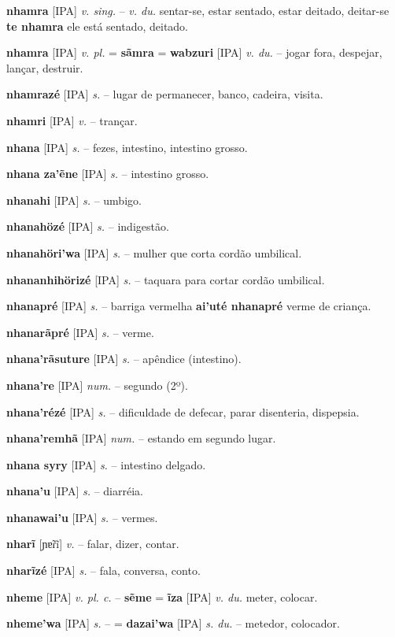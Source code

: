 \textbf{nhamra} [IPA] \textit{v. sing.} -- \textit{v. du.} sentar-se, estar sentado, estar deitado, deitar-se  \textbf{te nhamra} ele está sentado, deitado.

\textbf{nhamra} [IPA] \textit{v. pl.} = \textbf{sãmra} = \textbf{wabzuri} [IPA] \textit{v. du.} -- jogar fora, despejar, lançar, destruir.

\textbf{nhamrazé} [IPA] \textit{s.} -- lugar de permanecer, banco, cadeira, visita.

\textbf{nhamri} [IPA] \textit{v.} -- trançar.

\textbf{nhana} [IPA] \textit{s.} -- fezes, intestino, intestino grosso.

\textbf{nhana za'ẽne} [IPA] \textit{s.} -- intestino grosso.

\textbf{nhanahi} [IPA] \textit{s.} -- umbigo.

\textbf{nhanahözé} [IPA] \textit{s.} -- indigestão.

\textbf{nhanahöri'wa} [IPA] \textit{s.} -- mulher que corta cordão umbilical.

\textbf{nhananhihörizé} [IPA] \textit{s.} -- taquara para cortar cordão umbilical.

\textbf{nhanapré} [IPA] \textit{s.} -- barriga vermelha  \textbf{ai'uté nhanapré} verme de criança.

\textbf{nhanarãpré} [IPA] \textit{s.} -- verme.

\textbf{nhana'rãsuture} [IPA] \textit{s.} -- apêndice (intestino).

\textbf{nhana're} [IPA] \textit{num.} -- segundo (2º).

\textbf{nhana'rézé} [IPA] \textit{s.} -- dificuldade de defecar, parar disenteria, dispepsia.

\textbf{nhana'remhã} [IPA] \textit{num.} -- estando em segundo lugar.

\textbf{nhana syry} [IPA] \textit{s.} -- intestino delgado.

\textbf{nhana'u} [IPA] \textit{s.} -- diarréia.

\textbf{nhanawai'u} [IPA] \textit{s.} -- vermes.

\textbf{nharĩ} [ɲɐ̃ɾĩ] \textit{v.} -- falar, dizer, contar.

\textbf{nharĩzé} [IPA] \textit{s.} -- fala, conversa, conto.

\textbf{nheme} [IPA] \textit{v. pl. c.} -- \textbf{sẽme} = \textbf{ĩza} [IPA] \textit{v. du.} meter, colocar.

\textbf{nheme'wa} [IPA] \textit{s.} -- = \textbf{dazai'wa} [IPA] \textit{s. du.} -- metedor, colocador.

